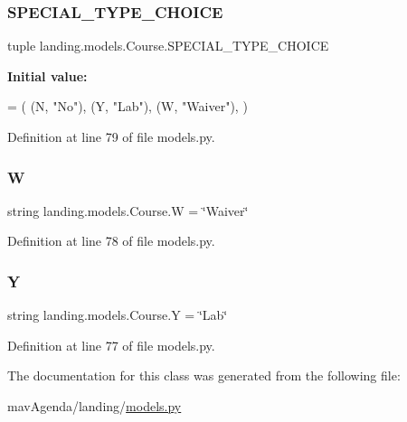 \subsubsection{\texorpdfstring{S\+P\+E\+C\+I\+A\+L\+\_\+\+T\+Y\+P\+E\+\_\+\+C\+H\+O\+I\+CE}{SPECIAL\_TYPE\_CHOICE}}
{\footnotesize\ttfamily tuple landing.\+models.\+Course.\+S\+P\+E\+C\+I\+A\+L\+\_\+\+T\+Y\+P\+E\+\_\+\+C\+H\+O\+I\+CE\hspace{0.3cm}{\ttfamily [static]}}

{\bfseries Initial value\+:}
\begin{DoxyCode}
=  (
        (N, \textcolor{stringliteral}{"No"}),
        (Y, \textcolor{stringliteral}{"Lab"}),
        (W, \textcolor{stringliteral}{"Waiver"}),
    )
\end{DoxyCode}


Definition at line 79 of file models.\+py.

\mbox{\label{classlanding_1_1models_1_1Course_af5424af7cbb7df0adff059a54ddbf933}} 
\subsubsection{\texorpdfstring{W}{W}}
{\footnotesize\ttfamily string landing.\+models.\+Course.\+W = \char`\"{}Waiver\char`\"{}\hspace{0.3cm}{\ttfamily [static]}}



Definition at line 78 of file models.\+py.

\mbox{\label{classlanding_1_1models_1_1Course_a00ccedd8d49ed021b01bbe1aea40ebe3}} 
\subsubsection{\texorpdfstring{Y}{Y}}
{\footnotesize\ttfamily string landing.\+models.\+Course.\+Y = \char`\"{}Lab\char`\"{}\hspace{0.3cm}{\ttfamily [static]}}



Definition at line 77 of file models.\+py.



The documentation for this class was generated from the following file\+:\begin{DoxyCompactItemize}
\item 
mav\+Agenda/landing/\mbox{\hyperlink{models_8py}{models.\+py}}\end{DoxyCompactItemize}
